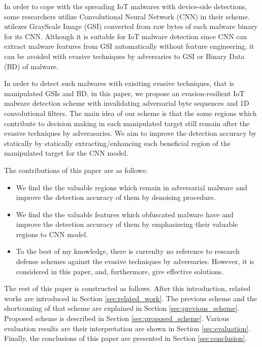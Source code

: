 In order to cope with the spreading IoT malwares with device-side detections, some researchers utilize Convolutional Neural Network (CNN) in their scheme.
\cite{} utilezes GrayScale Image (GSI) converted from raw bytes of each malware binary for its CNN.
Although it is suitable for IoT malware detection since CNN can extract malware features from GSI automatically without feature engineering, it can be avoided with evasive techniques by adversaries to GSI or Binary Data (BD) of malware. 

In order to detect such malwares with exisiting evasive techniques, that is manipulated GSIs and BD, in this paper, we propose an evasion-resilient IoT malware detection scheme with invalidating adversarial byte sequences and 1D convolutional filters.
The main idea of our scheme is that the some regions which contribute to decision making in each manipulated target still remain after the evasive techniques by adverasaries. 
We aim to improve the detection accuracy by statically by statically extracting/enhancing each beneficial region of the manipulated target for the CNN model.

The contributions of this paper are as follows: 
\begin{itemize}
 \item We find the the valuable regions which remain in adversarial malware and improve the detection accuracy of them by denoising procedure.
 \item We find the the valuable features which obfuscated malware have and improve the detection accuracy of them by emphasizeing their valuable regions to CNN model.
 \item To the best of my knowledge, there is currenlty no reference to research defense schemes against the evasive techniques by adversaries. However, it is considered in this paper, and, furthermore, give effective solutions.
\end{itemize}

The rest of this paper is constructed as follows. 
After this introduction, related works are introduced in Section \ref{sec:related_work}.
The previous scheme and the shortcoming of that scheme are explained in Section \ref{sec:previous_scheme}.
Proposed scheme is described in Section \ref{sec:proposed_scheme}.
Various evaluation results are their interpretation are shown in Section \ref{sec:evaluation}.
Finally, the conclusions of this paper are presented in Section \ref{sec:conclusion}.

